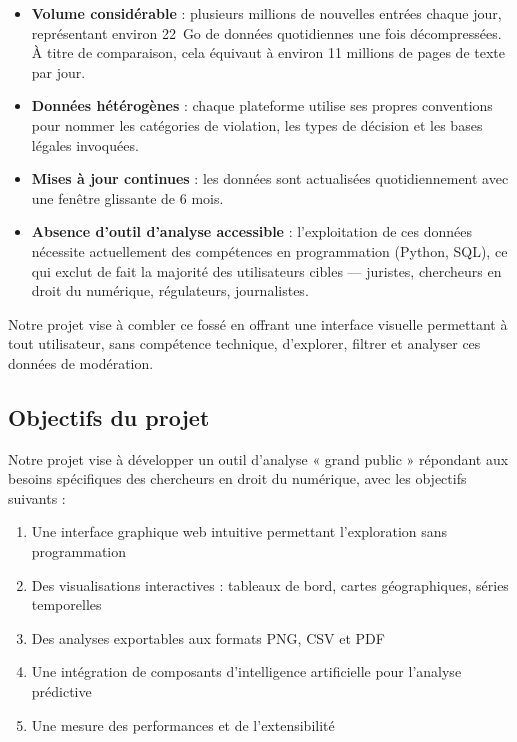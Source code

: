 \documentclass[10pt,twocolumn,a4paper]{article}
\begin{document}
\begin{itemize}
    \item \textbf{Volume considérable} : plusieurs millions de nouvelles entrées chaque jour, représentant environ 22~Go de données quotidiennes une fois décompressées. À titre de comparaison, cela équivaut à environ 11 millions de pages de texte par jour.
    \item \textbf{Données hétérogènes} : chaque plateforme utilise ses propres conventions pour nommer les catégories de violation, les types de décision et les bases légales invoquées.
    \item \textbf{Mises à jour continues} : les données sont actualisées quotidiennement avec une fenêtre glissante de 6 mois.
    \item \textbf{Absence d'outil d'analyse accessible} : l'exploitation de ces données nécessite actuellement des compétences en programmation (Python, SQL), ce qui exclut de fait la majorité des utilisateurs cibles --- juristes, chercheurs en droit du numérique, régulateurs, journalistes.
\end{itemize}

Notre projet vise à combler ce fossé en offrant une interface visuelle permettant à tout utilisateur, sans compétence technique, d'explorer, filtrer et analyser ces données de modération.

\subsection{Objectifs du projet}

Notre projet vise à développer un outil d'analyse « grand public » répondant aux besoins spécifiques des chercheurs en droit du numérique, avec les objectifs suivants :

\begin{enumerate}
    \item Une interface graphique web intuitive permettant l'exploration sans programmation
    \item Des visualisations interactives : tableaux de bord, cartes géographiques, séries temporelles
    \item Des analyses exportables aux formats PNG, CSV et PDF
    \item Une intégration de composants d'intelligence artificielle pour l'analyse prédictive
    \item Une mesure des performances et de l'extensibilité
\end{enumerate}
\end{document}
